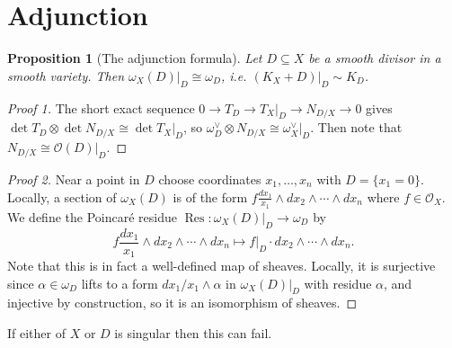 \documentclass{article}
\newtheorem*{proposition}{Proposition}
\theoremstyle{definition}
\DeclareMathOperator{\Res}{Res}
\renewcommand{\O}{\mathcal{O}}
\begin{document}
\section*{Adjunction}

\begin{proposition}[The adjunction formula]
    Let $D\subseteq X$ be a smooth divisor in a smooth variety. Then
    $\omega_X(D)|_D\cong\omega_D$, i.e. $(K_X+D)|_D\sim K_D$.
\end{proposition}

\begin{proof}[Proof 1]
    The short exact sequence $0\to T_D\to T_X|_D\to N_{D/X}\to0$ gives
    $\det T_D\otimes\det N_{D/X}\cong\det T_X|_D$, so
    $\omega_D^\vee\otimes N_{D/X}\cong \omega_X^\vee|_D$. Then note that
    $N_{D/X}\cong\O(D)|_D$.
\end{proof}

\begin{proof}[Proof 2]
    Near a point in $D$ choose coordinates $x_1,\ldots,x_n$ with $D=\{x_1=0\}$.
    Locally, a section of $\omega_X(D)$ is of the form
    $f\frac{dx_1}{x_1}\wedge dx_2\wedge\cdots\wedge dx_n$ where $f\in\O_X$. We
    define the Poincar\'e residue $\Res:\omega_X(D)|_D\to\omega_D$ by
    \begin{equation*}
        f\frac{dx_1}{x_1}\wedge dx_2\wedge\cdots\wedge dx_n
            \mapsto f|_D\cdot dx_2\wedge\cdots\wedge dx_n.
    \end{equation*}
    Note that this is in fact a well-defined map of sheaves. Locally, it is
    surjective since $\alpha\in\omega_D$ lifts to a form $dx_1/x_1\wedge\alpha$
    in $\omega_X(D)|_D$ with residue $\alpha$, and injective by construction, so
    it is an isomorphism of sheaves.
\end{proof}

If either of $X$ or $D$ is singular then this can fail.
\end{document}
